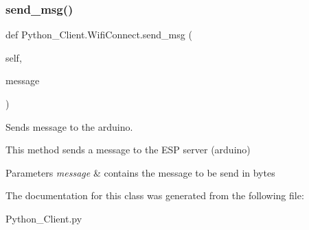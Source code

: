 \subsubsection{\texorpdfstring{send\+\_\+msg()}{send\_msg()}}
{\footnotesize\ttfamily def Python\+\_\+\+Client.\+Wifi\+Connect.\+send\+\_\+msg (\begin{DoxyParamCaption}\item[{}]{self,  }\item[{}]{message }\end{DoxyParamCaption})}



Sends message to the arduino. 

This method sends a message to the E\+SP server (arduino)


\begin{DoxyParams}{Parameters}
{\em message} & contains the message to be send in bytes \\
\hline
\end{DoxyParams}


The documentation for this class was generated from the following file\+:\begin{DoxyCompactItemize}
\item 
Python\+\_\+\+Client.\+py\end{DoxyCompactItemize}
